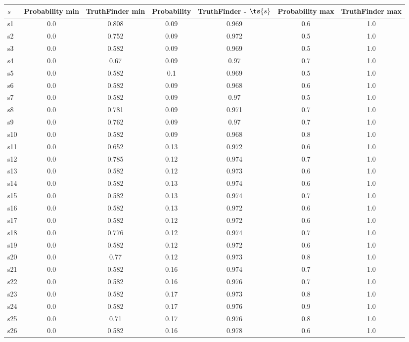 \documentclass{article}
\begin{document}
\noindent\begin{tabular}{|l|c|c|c|c|c|c|}
\hline
$s$& Probability min & TruthFinder min & Probability & TruthFinder - $\ts{s}$ & Probability max & TruthFinder max\\
\hline
s1 &0.0 & 0.808 & 0.09 & 0.969 & 0.6 & 1.0\\
\hline
s2 &0.0 & 0.752 & 0.09 & 0.972 & 0.5 & 1.0\\
\hline
s3 &0.0 & 0.582 & 0.09 & 0.969 & 0.5 & 1.0\\
\hline
s4 &0.0 & 0.67 & 0.09 & 0.97 & 0.7 & 1.0\\
\hline
s5 &0.0 & 0.582 & 0.1 & 0.969 & 0.5 & 1.0\\
\hline
s6 &0.0 & 0.582 & 0.09 & 0.968 & 0.6 & 1.0\\
\hline
s7 &0.0 & 0.582 & 0.09 & 0.97 & 0.5 & 1.0\\
\hline
s8 &0.0 & 0.781 & 0.09 & 0.971 & 0.7 & 1.0\\
\hline
s9 &0.0 & 0.762 & 0.09 & 0.97 & 0.7 & 1.0\\
\hline
s10 &0.0 & 0.582 & 0.09 & 0.968 & 0.8 & 1.0\\
\hline
s11 &0.0 & 0.652 & 0.13 & 0.972 & 0.6 & 1.0\\
\hline
s12 &0.0 & 0.785 & 0.12 & 0.974 & 0.7 & 1.0\\
\hline
s13 &0.0 & 0.582 & 0.12 & 0.973 & 0.6 & 1.0\\
\hline
s14 &0.0 & 0.582 & 0.13 & 0.974 & 0.6 & 1.0\\
\hline
s15 &0.0 & 0.582 & 0.13 & 0.974 & 0.7 & 1.0\\
\hline
s16 &0.0 & 0.582 & 0.13 & 0.972 & 0.6 & 1.0\\
\hline
s17 &0.0 & 0.582 & 0.12 & 0.972 & 0.6 & 1.0\\
\hline
s18 &0.0 & 0.776 & 0.12 & 0.974 & 0.7 & 1.0\\
\hline
s19 &0.0 & 0.582 & 0.12 & 0.972 & 0.6 & 1.0\\
\hline
s20 &0.0 & 0.77 & 0.12 & 0.973 & 0.8 & 1.0\\
\hline
s21 &0.0 & 0.582 & 0.16 & 0.974 & 0.7 & 1.0\\
\hline
s22 &0.0 & 0.582 & 0.16 & 0.976 & 0.7 & 1.0\\
\hline
s23 &0.0 & 0.582 & 0.17 & 0.973 & 0.8 & 1.0\\
\hline
s24 &0.0 & 0.582 & 0.17 & 0.976 & 0.9 & 1.0\\
\hline
s25 &0.0 & 0.71 & 0.17 & 0.976 & 0.8 & 1.0\\
\hline
s26 &0.0 & 0.582 & 0.16 & 0.978 & 0.6 & 1.0\\

\end{tabular}
\end{document}

